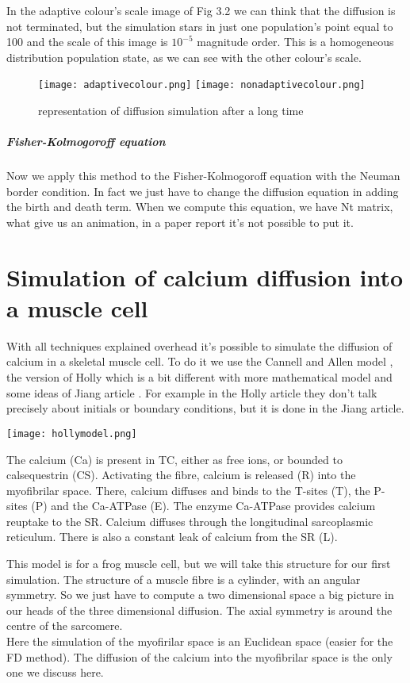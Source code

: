 \documentclass[a4paper,11pt]{report}
\begin{document}
 In the adaptive colour's scale image of Fig 3.2 we can think that the diffusion is not terminated, but the simulation stars in just one population's point equal to 100 and the scale of this image is $10^{-5}$ magnitude order. This is a homogeneous distribution population state, as we can see with the other colour's scale. 
\begin{figure}
\texttt{[image: adaptivecolour.png]}\hfill
\texttt{[image: nonadaptivecolour.png]}
\caption{representation of diffusion simulation after a long time}\label{fig1}
\end{figure}
\paragraph{Fisher-Kolmogoroff equation}
Now we apply this method to the Fisher-Kolmogoroff equation with the Neuman border condition. In fact we just have to change the diffusion equation in adding the birth and death term.
When we compute this equation, we have Nt matrix, what give us an animation, in a paper report it's not possible to put it.

\chapter{Simulation of calcium diffusion into a muscle cell}
With all techniques explained overhead it's possible to simulate the diffusion of calcium in a skeletal muscle cell. To do it we use the Cannell and Allen model \cite{Cannell1984}, the version of Holly which is a bit different with more mathematical model \cite{Holly1989} and some ideas of Jiang article \cite{Jiang1999}. For example in the Holly article they don't talk precisely about initials or boundary conditions, but it is done in the Jiang article. 

\begin{minipage}{0.5\linewidth}
\texttt{[image: hollymodel.png]} 
\label{fig1}
\end{minipage}\hfill
\begin{minipage}{0.47\linewidth}
The calcium (Ca) is present in TC, either as free ions, or bounded to calsequestrin (CS). Activating the fibre, calcium is released (R)
into the myofibrilar space. There, calcium diffuses and binds to the T-sites (T), the P-sites (P) and
the Ca-ATPase (E). The enzyme Ca-ATPase provides calcium reuptake to the SR. Calcium diffuses
through the longitudinal sarcoplasmic reticulum. There is also a constant
leak of calcium from the SR (L). \cite{Holly1989} 
\end{minipage} 
 This model is for a frog muscle cell, but we will take this structure for our first simulation. The structure of a muscle fibre is a cylinder, with an angular symmetry. So we just have to compute a two dimensional space a big picture in our heads of the three dimensional diffusion. The axial symmetry is around the centre of the sarcomere. \\
Here the simulation of the myofirilar space is an Euclidean space (easier for the FD method). The diffusion of the calcium into the myofibrilar space is the only one we discuss here. 
\end{document}
